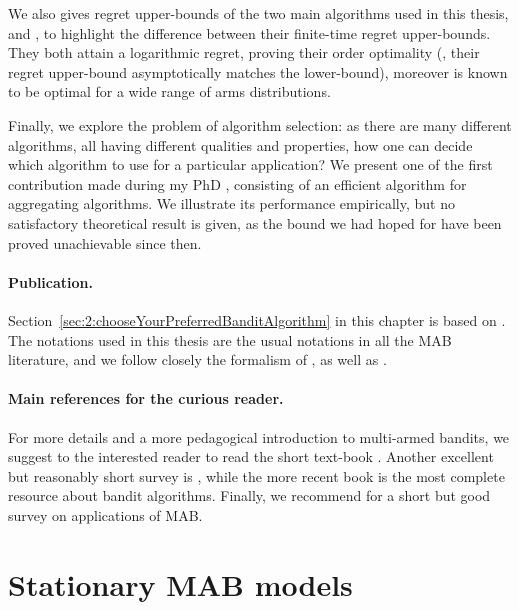 We also gives regret upper-bounds of the two main algorithms used in this thesis, \UCB{} and \klUCB, to highlight the difference between their finite-time regret upper-bounds. They both attain a logarithmic regret, proving their order optimality (\ie, their regret upper-bound asymptotically matches the lower-bound), moreover \klUCB{} is known to be optimal for a wide range of arms distributions.

Finally, we explore the problem of algorithm selection: as there are many different algorithms, all having different qualities and properties, how one can decide which algorithm to use for a particular application?
We present one of the first contribution made during my PhD \cite{Besson2018WCNC}, consisting of an efficient algorithm for aggregating algorithms.
We illustrate its performance empirically, but no satisfactory theoretical result is given, as the bound we had hoped for have been proved unachievable since then.


\paragraph{Publication.}
%
Section~\ref{sec:2:chooseYourPreferredBanditAlgorithm} in this chapter is based on \cite{Besson2018WCNC}.
The notations used in this thesis are the usual notations in all the MAB literature, and we follow closely the formalism of \cite{Kaufmann12PhD}, as well as \cite{Slivkins2019,LattimoreBanditAlgorithmsBook,Bubeck12}.


\paragraph{Main references for the curious reader.}
%
For more details and a more pedagogical introduction to multi-armed bandits, we suggest to the interested reader to read the short text-book \cite{Slivkins2019}.
Another excellent but reasonably short survey is \cite{Bubeck12}, while the more recent book \cite{LattimoreBanditAlgorithmsBook} is the most complete resource about bandit algorithms.
Finally, we recommend \cite{bouneffouf2019survey} for a short but good survey on applications of MAB.


\newpage
\graphicspath{{2-Chapters/2-Chapter/Images/}}


\section{Stationary MAB models}
\label{sec:2:notations}


